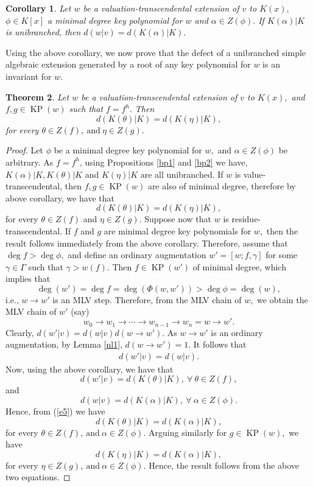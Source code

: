 \documentclass[11pt]{amsart}
\newtheorem{theorem}{Theorem}[section]
\newtheorem{corollary}[theorem]{Corollary}
\theoremstyle{definition}
\theoremstyle{remark}
\numberwithin{equation}{section}
\begin{document}
	    \begin{corollary}\label{2.11}
	    	Let $w$ be a valuation-transcendental extension of $v$ to $K(x),$ $\phi\in K[x]$ a minimal degree key polynomial for $w$ and $\alpha \in Z(\phi).$ If $K(\alpha)|K$ is unibranched, then  $d(w|v)=d(K(\alpha)|K).$ 
	    \end{corollary}
	  Using the above corollary, we now prove that the defect of a unibranched simple algebraic extension generated by a root of any key polynomial for $w$ is an invariant for $w.$
	    \begin{theorem}\label{2.12}
	    	Let $w$ be a valuation-transcendental extension of $v$ to $K(x),$ and $f,g\in \operatorname{KP}(w)$ such that  $f=f^h.$ Then  \[d(K(\theta)|K)=d(K(\eta)|K), \]	for every $\theta\in Z(f), \ \text{and} \ \eta \in Z(g).$
	    \end{theorem}
	    \begin{proof}Let $\phi$ be a minimal degree key polynomial for $w,$ and $\alpha\in Z(\phi)$ be arbitrary. As $f=f^h$, using Propositions \ref{bp1} and \ref{bp2} we have, $K(\alpha)|K, K(\theta)|K$ and $K(\eta)|K$ are all unibranched. If $w$ is value-transcendental, then $f,g\in \operatorname{KP}(w)$ are also of minimal degree, therefore by above corollary, we have that \[d(K(\theta)|K)=d(K(\eta)|K), \] for every $\theta\in Z(f)$ and $\eta \in Z(g).$ Suppose now that $w$ is residue-transcendental. If $f$ and $g$ are minimal degree key polynomials for $w,$ then the result follows immediately from the above corollary. Therefore, assume that $\deg f>\deg \phi,$ and define an ordinary augmentation $w'=[w;f,\gamma]$ for some $\gamma\in\Gamma$ such that $\gamma>w(f).$ Then $f\in \operatorname{KP}(w')$ of minimal degree, which implies that \[\deg (w')=\deg f=\deg (\Phi(w,w'))>\deg \phi=\deg (w),\] i.e., $w\longrightarrow w'$ is an MLV step. Therefore, from the MLV chain of $w,$  we obtain the MLV chain of $w'$ (say)
	    	\[w_0\longrightarrow w_1 \longrightarrow \cdots \longrightarrow w_{n-1} \longrightarrow w_n=w\longrightarrow w'.\]
	    	Clearly, $d(w'|v)=d(w|v)d(w\longrightarrow w').$ As $w\longrightarrow w'$ is an ordinary augmentation, by Lemma \ref{nl1}, $d(w\longrightarrow w')=1.$	It follows that
	    	\begin{align}\label{e5}
	    		d(w'|v)=d(w|v).\end{align}
	    	Now, using the above corollary, we have that 
	    	\[d(w'|v)=d(K(\theta)|K), \ \forall \ \theta \in Z(f),\]  and \[d(w|v)=d(K(\alpha)|K), \ \forall \ \alpha \in Z(\phi).\]	Hence, from (\ref{e5}) we have\[d(K(\theta)|K)=d(K(\alpha)|K), \] for every $\theta\in Z(f), \ \text{and} \ \alpha \in Z(\phi).$ Arguing similarly for $g\in\operatorname{KP}(w),$ we have
	    	\[d(K(\eta)|K)=d(K(\alpha)|K), \] for every $\eta\in Z(g), \ \text{and} \ \alpha \in Z(\phi).$ Hence, the result follows from the above two equations.
	    \end{proof}
	    
\end{document}
